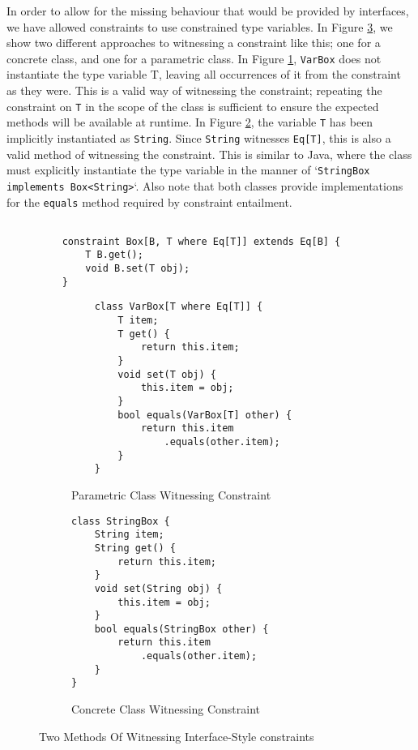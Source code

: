 In order to allow for the missing behaviour that would be provided by interfaces, we have allowed constraints to use constrained type variables. In Figure \ref{fig:interface-class}, we show two different approaches to witnessing a constraint like this; one for a concrete class, and one for a parametric class. In Figure \ref{fig:interface-class-var}, \texttt{VarBox} does not instantiate the type variable T, leaving all occurrences of it from the constraint as they were. This is a valid way of witnessing the constraint; repeating the constraint on \texttt{T} in the scope of the class is sufficient to ensure the expected methods will be available at runtime. In Figure \ref{fig:interface-class-con}, the variable \texttt{T} has been implicitly instantiated as \texttt{String}. Since \texttt{String} witnesses \texttt{Eq[T]}, this is also a valid method of witnessing the constraint. This is similar to Java, where the class must explicitly instantiate the type variable in the manner of `\texttt{StringBox implements Box<String>}`. Also note that both classes provide implementations for the \texttt{equals} method required by constraint entailment. \\

\begin{figure}
    \centering
    \begin{verbatim}
    
    constraint Box[B, T where Eq[T]] extends Eq[B] {
        T B.get();
        void B.set(T obj);
    }
    \end{verbatim}
    \begin{subfigure}[t]{0.45\textwidth}
        \centering
        \begin{verbatim}
    class VarBox[T where Eq[T]] {
        T item;
        T get() {
            return this.item;
        }
        void set(T obj) {
            this.item = obj;
        }
        bool equals(VarBox[T] other) {
            return this.item
                .equals(other.item);
        }
    }
        \end{verbatim}
        \caption{Parametric Class Witnessing Constraint}
        \label{fig:interface-class-var}
    \end{subfigure}
    \hfill
    \begin{subfigure}[t]{0.45\textwidth}
        \centering
        \begin{verbatim}
class StringBox {
    String item;
    String get() {
        return this.item;
    }
    void set(String obj) {
        this.item = obj;
    }
    bool equals(StringBox other) {
        return this.item
            .equals(other.item);
    }
}
        \end{verbatim}
        \caption{Concrete Class Witnessing Constraint}
        \label{fig:interface-class-con}
    \end{subfigure}
    \caption{Two Methods Of Witnessing Interface-Style constraints}
    \label{fig:interface-class}
\end{figure}

